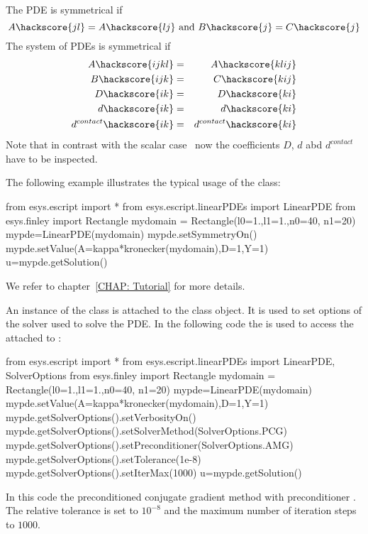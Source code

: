 The PDE is symmetrical  if
\begin{equation}\label{LINEARPDE.SINGLE.4}
A\hackscore{jl}=A\hackscore{lj} \mbox{ and } B\hackscore{j}=C\hackscore{j}
\end{equation}
The system of PDEs is symmetrical  if
\begin{eqnarray}
\label{LINEARPDE.SYSTEM.4}
A\hackscore{ijkl}&=&A\hackscore{klij} \\
B\hackscore{ijk}&=&C\hackscore{kij} \\
D\hackscore{ik}&=&D\hackscore{ki} \\
d\hackscore{ik}&=&d\hackscore{ki} \\
d^{contact}\hackscore{ik}&=&d^{contact}\hackscore{ki}
\end{eqnarray}
Note that in contrast with the scalar case~ now the coefficients $D$, $d$ abd $d^{contact}$
have to be inspected.

The following example illustrates the typical usage of the \LinearPDE class:
\begin{python}
from esys.escript import *
from esys.escript.linearPDEs import LinearPDE
from esys.finley import Rectangle
mydomain = Rectangle(l0=1.,l1=1.,n0=40, n1=20)
mypde=LinearPDE(mydomain)
mypde.setSymmetryOn()
mypde.setValue(A=kappa*kronecker(mydomain),D=1,Y=1)
u=mypde.getSolution()
\end{python}
We refer to chapter~\ref{CHAP: Tutorial} for more details.

An instance of the \SolverOptions class is attached to the \LinearPDE class object. It is used to set options of the solver used to solve the PDE. In the following
code the  is used to access the  \SolverOptions 
attached to :
\begin{python}
from esys.escript import *
from esys.escript.linearPDEs import LinearPDE, SolverOptions
from esys.finley import Rectangle
mydomain = Rectangle(l0=1.,l1=1.,n0=40, n1=20)
mypde=LinearPDE(mydomain)
mypde.setValue(A=kappa*kronecker(mydomain),D=1,Y=1)
mypde.getSolverOptions().setVerbosityOn()
mypde.getSolverOptions().setSolverMethod(SolverOptions.PCG)
mypde.getSolverOptions().setPreconditioner(SolverOptions.AMG)
mypde.getSolverOptions().setTolerance(1e-8)
mypde.getSolverOptions().setIterMax(1000)
u=mypde.getSolution()
\end{python}
In this code the preconditioned conjugate gradient method \PCG
with preconditioner \AMG. The relative tolerance is set to $10^{-8}$ and
the maximum number of iteration steps to $1000$.

